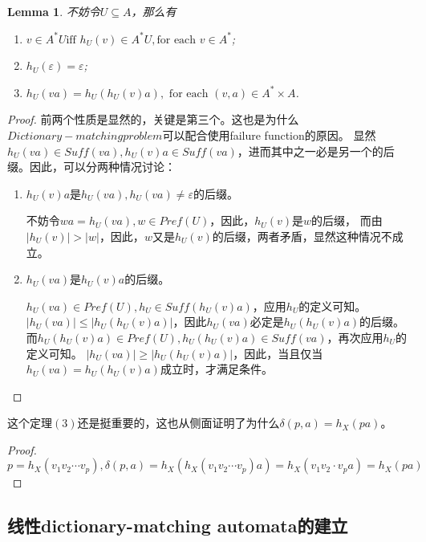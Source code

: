 \documentclass[UTF8]{ctexart}
\newtheorem{lem}[thm]{Lemma}
\theoremstyle{definition}
\theoremstyle{remark}
\numberwithin{equation}{subsection}
\newcommand{\Suff}{\textit{Suff}}
\begin{document}
	\begin{lem}
		不妨令$U \subseteq A$，那么有
		\begin{enumerate}[(1)]
			\item $v \in A^*U \text{iff } h_U(v) \in A^*U, \text{for each } v \in A^*$;
			\item $h_U(\varepsilon) = \varepsilon$;
			\item $h_U(va) = h_U(h_U(v)a), \text{ for each } (v, a) \in A^* \times A$.
		\end{enumerate}
	\end{lem}
	\begin{proof}
		前两个性质是显然的，关键是第三个。这也是为什么$Dictionary-matching problem$可以配合使用failure function的原因。
		显然$h_U(va) \in \Suff(va), h_U(v)a \in \Suff(va)$，进而其中之一必是另一个的后缀。因此，可以分两种情况讨论：
		\begin{enumerate}[(1)]
			\item $h_U(v)a$是$h_U(va), h_U(va) \neq \varepsilon$的后缀。
			
			不妨令$wa = h_U(va), w \in Pref(U)$，因此，$h_U(v)$是$w$的后缀，
			而由$|h_U(v)| > |w|$，因此，$w$又是$h_U(v)$的后缀，两者矛盾，显然这种情况不成立。
			
			\item $h_U(va)$是$h_U(v)a$的后缀。
			
			$h_U(va) \in Pref(U), h_U \in \Suff(h_U(v)a)$，应用$h_U$的定义可知。
			$|h_U(va)| \le |h_U(h_U(v)a)|$，因此$h_U(va)$必定是$h_U(h_U(v)a)$的后缀。
			而$h_U(h_U(v)a) \in Pref(U), h_U(h_U(v)a) \in \Suff(va)$，再次应用$h_U$的定义可知。
			$|h_U(va)| \ge |h_U(h_U(v)a)|$，因此，当且仅当$h_U(va) = h_U(h_U(v)a)$成立时，才满足条件。
			
		\end{enumerate}
	\end{proof}

	这个定理$(3)$还是挺重要的，这也从侧面证明了为什么$\delta(p,a)=h_X(pa)$。
	\begin{proof}
		$p = h_X(v_1v_2 \cdots v_p), \delta(p, a) = h_X(h_X(v_1v_2 \cdots v_p)a) = h_X(v_1v_2 \cdot v_p a)=h_X(pa)$
	\end{proof}
	
\subsection{线性dictionary-matching automata的建立}
	
\end{document}
